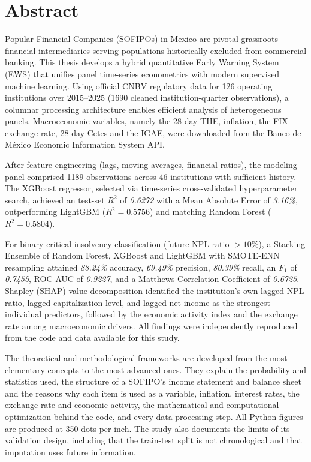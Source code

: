 \chapter*{Abstract}
Popular Financial Companies (SOFIPOs) in Mexico are pivotal grassroots financial intermediaries serving populations historically excluded from commercial banking. This thesis develops a hybrid quantitative Early Warning System (EWS) that unifies panel time-series econometrics with modern supervised machine learning. Using official CNBV regulatory data for 126 operating institutions over 2015--2025 (1690 cleaned institution-quarter observations), a columnar processing architecture enables efficient analysis of heterogeneous panels. Macroeconomic variables, namely the 28-day TIIE, inflation, the FIX exchange rate, 28-day Cetes and the IGAE, were downloaded from the Banco de México Economic Information System API.

After feature engineering (lags, moving averages, financial ratios), the modeling panel comprised 1189 observations across 46 institutions with sufficient history. The XGBoost regressor, selected via time-series cross-validated hyperparameter search, achieved an test-set $R^2$ of \textit{0.6272} with a Mean Absolute Error of \textit{3.16\%}, outperforming LightGBM ($R^2=0.5756$) and matching Random Forest ($R^2=0.5804$).

For binary critical-insolvency classification (future NPL ratio $>10\%$), a Stacking Ensemble of Random Forest, XGBoost and LightGBM with SMOTE-ENN resampling attained \textit{88.24\%} accuracy, \textit{69.49\%} precision, \textit{80.39\%} recall, an $F_1$ of \textit{0.7455}, ROC-AUC of \textit{0.9227}, and a Matthews Correlation Coefficient of \textit{0.6725}. Shapley (SHAP) value decomposition identified the institution's own lagged NPL ratio, lagged capitalization level, and lagged net income as the strongest individual predictors, followed by the economic activity index and the exchange rate among macroeconomic drivers. All findings were independently reproduced from the code and data available for this study.

The theoretical and methodological frameworks are developed from the most elementary concepts to the most advanced ones. They explain the probability and statistics used, the structure of a SOFIPO's income statement and balance sheet and the reasons why each item is used as a variable, inflation, interest rates, the exchange rate and economic activity, the mathematical and computational optimization behind the code, and every data-processing step. All Python figures are produced at 350 dots per inch. The study also documents the limits of its validation design, including that the train-test split is not chronological and that imputation uses future information.

